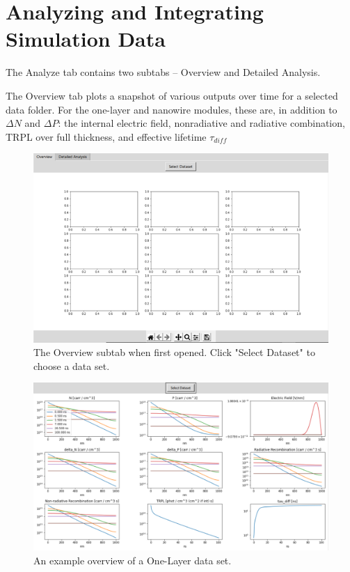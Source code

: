 \documentclass[11pt,letterpaper,titlepage]{article}
\begin{document}
	\newpage
	\section{Analyzing and Integrating Simulation Data}
		\par The Analyze tab contains two subtabs – Overview and Detailed Analysis.
		
		\par The Overview tab plots a snapshot of various outputs over time for a selected data folder. For the one-layer and nanowire modules, these are, in addition to $\Delta N$ and $\Delta P$: the internal electric field, nonradiative and radiative combination, TRPL over full thickness, and effective lifetime $\tau_{diff}$
		
		\begin{figure}[H]
			\label{fig:overview_blank}
			\centering
			\includegraphics[scale=0.8]{"overview_blank"}
			\caption{The Overview subtab when first opened. Click "Select Dataset" to choose a data set.}
		\end{figure}
	
		\begin{figure}[H]
			\label{fig:overview_example}
			\centering
			\includegraphics[scale=0.4]{"overview_example"}
			\caption{An example overview of a One-Layer data set.}
		\end{figure}
	
\end{document}
